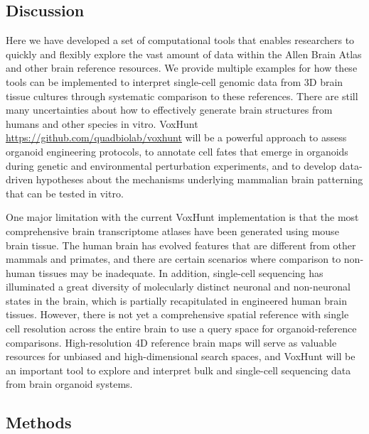 \subsection{Discussion}
Here we have developed a set of computational tools that enables researchers to quickly and flexibly explore the vast amount of data within the Allen Brain Atlas and other brain reference resources. We provide multiple examples for how these tools can be implemented to interpret single-cell genomic data from 3D brain tissue cultures through systematic comparison to these references. There are still many uncertainties about how to effectively generate brain structures from humans and other species in vitro. VoxHunt \href{https://github.com/quadbiolab/voxhunt}{https://github.com/quadbiolab/voxhunt} will be a powerful approach to assess organoid engineering protocols, to annotate cell fates that emerge in organoids during genetic and environmental perturbation experiments, and to develop data-driven hypotheses about the mechanisms underlying mammalian brain patterning that can be tested in vitro. 

One major limitation with the current VoxHunt implementation is that the most comprehensive brain transcriptome atlases have been generated using mouse brain tissue. The human brain has evolved features that are different from other mammals and primates, and there are certain scenarios where comparison to non-human tissues may be inadequate. In addition, single-cell sequencing has illuminated a great diversity of molecularly distinct neuronal and non-neuronal states in the brain, which is partially recapitulated in engineered human brain tissues. However, there is not yet a comprehensive spatial reference with single cell resolution across the entire brain to use a query space for organoid-reference comparisons. High-resolution 4D reference brain maps will serve as valuable resources for unbiased and high-dimensional search spaces, and VoxHunt will be an important tool to explore and interpret bulk and single-cell sequencing data from brain organoid systems. 


\subsection{Methods}

